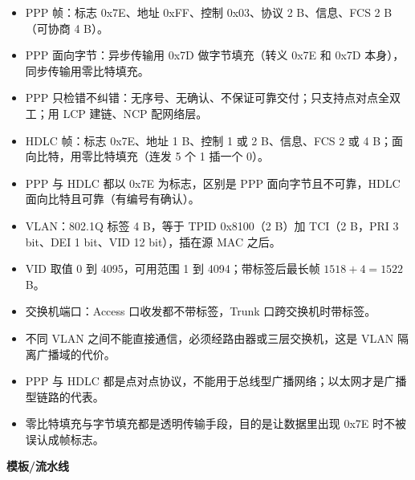 \documentclass[10pt,a4paper]{ctexart}
\begin{document}
\begin{itemize}

\item PPP 帧：标志 0x7E、地址 0xFF、控制 0x03、协议 2 B、信息、FCS 2 B（可协商 4 B）。

\item PPP 面向字节：异步传输用 0x7D 做字节填充（转义 0x7E 和 0x7D 本身），同步传输用零比特填充。

\item PPP 只检错不纠错：无序号、无确认、不保证可靠交付；只支持点对点全双工；用 LCP 建链、NCP 配网络层。

\item HDLC 帧：标志 0x7E、地址 1 B、控制 1 或 2 B、信息、FCS 2 或 4 B；面向比特，用零比特填充（连发 5 个 1 插一个 0）。

\item PPP 与 HDLC 都以 0x7E 为标志，区别是 PPP 面向字节且不可靠，HDLC 面向比特且可靠（有编号有确认）。

\item VLAN：802.1Q 标签 4 B，等于 TPID 0x8100（2 B）加 TCI（2 B，PRI 3 bit、DEI 1 bit、VID 12 bit），插在源 MAC 之后。

\item VID 取值 0 到 4095，可用范围 1 到 4094；带标签后最长帧 $1518 + 4 = 1522$ B。

\item 交换机端口：Access 口收发都不带标签，Trunk 口跨交换机时带标签。

\item 不同 VLAN 之间不能直接通信，必须经路由器或三层交换机，这是 VLAN 隔离广播域的代价。

\item PPP 与 HDLC 都是点对点协议，不能用于总线型广播网络；以太网才是广播型链路的代表。

\item 零比特填充与字节填充都是透明传输手段，目的是让数据里出现 0x7E 时不被误认成帧标志。

\end{itemize}


\textbf{模板/流水线}
\end{document}
